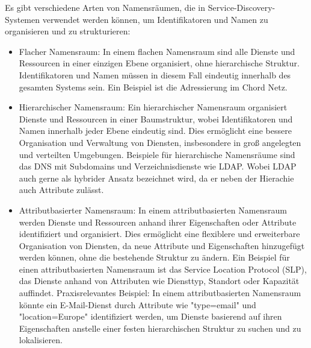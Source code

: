Es gibt verschiedene Arten von Namensräumen, die in Service-Discovery-Systemen verwendet werden können, um Identifikatoren und Namen zu organisieren und zu strukturieren:
\begin{itemize}
\item Flacher Namensraum: In einem flachen Namensraum sind alle Dienste und Ressourcen in einer einzigen Ebene organisiert, ohne hierarchische Struktur. Identifikatoren und Namen müssen in diesem Fall eindeutig innerhalb des gesamten Systems sein. Ein Beispiel ist die Adressierung im Chord Netz. 
\item Hierarchischer Namensraum: Ein hierarchischer Namensraum organisiert Dienste und Ressourcen in einer Baumstruktur, wobei Identifikatoren und Namen innerhalb jeder Ebene eindeutig sind. Dies ermöglicht eine bessere Organisation und Verwaltung von Diensten, insbesondere in groß angelegten und verteilten Umgebungen. Beispiele für hierarchische Namensräume sind das DNS mit Subdomains und Verzeichnisdienste wie LDAP. Wobei LDAP auch gerne als hybrider Ansatz bezeichnet wird, da er neben der Hierachie auch Attribute zulässt. 
\item     Attributbasierter Namensraum: In einem attributbasierten Namensraum werden Dienste und Ressourcen anhand ihrer Eigenschaften oder Attribute identifiziert und organisiert. Dies ermöglicht eine flexiblere und erweiterbare Organisation von Diensten, da neue Attribute und Eigenschaften hinzugefügt werden können, ohne die bestehende Struktur zu ändern. Ein Beispiel für einen attributbasierten Namensraum ist das Service Location Protocol (SLP), das Dienste anhand von Attributen wie Diensttyp, Standort oder Kapazität auffindet. Praxisrelevantes Beispiel: In einem attributbasierten Namensraum könnte ein E-Mail-Dienst durch Attribute wie "type=email" und "location=Europe" identifiziert werden, um Dienste basierend auf ihren Eigenschaften anstelle einer festen hierarchischen Struktur zu suchen und zu lokalisieren.
\end{itemize}

